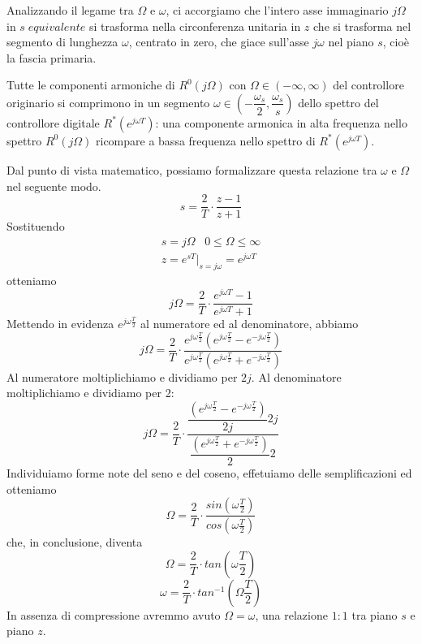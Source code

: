 \documentclass[a4paper]{report}
\begin{document}
Analizzando il legame tra $\Omega$ e $\omega$, ci accorgiamo che
l'intero asse immaginario $j \Omega$ in $s\; equivalente$ si trasforma
nella circonferenza unitaria in $z$ che si trasforma nel segmento di
lunghezza $\omega$, centrato in zero, che giace sull'asse $j \omega$
nel piano $s$, cio\`e la fascia primaria.

Tutte le componenti armoniche di $R^{0}(j \Omega)$ con $\Omega \in
(-\infty, \infty)$ del controllore originario si comprimono in un
segmento $\omega \in \left( -\dfrac{\omega_s}{2},
\dfrac{\omega_s}{s}\right)$ dello spettro del controllore digitale
$R^{*}(e^{j \omega T})$: una componente armonica in alta frequenza
nello spettro $R^{0}(j \Omega)$ ricompare a bassa frequenza nello
spettro di $R^{*}(e^{j \omega T})$.

Dal punto di vista matematico, possiamo formalizzare questa relazione
tra $\omega$ e $\Omega$ nel seguente modo.
\[
s = \dfrac{2}{T} \cdot \dfrac{z - 1}{z + 1}
\]
Sostituendo
\[
\begin{array}{l}
  s = j \Omega \;\;\;0 \leq \Omega \leq \infty\\
  z = e^{sT}|_{s = j \omega} = e^{j \omega T}
\end{array}
\]
otteniamo
\[
j \Omega = \dfrac{2}{T} \cdot \dfrac{e^{j \omega T} - 1}{e^{j \omega
    T} + 1}
\]
Mettendo in evidenza $e^{j \omega \frac{T}{2}}$ al numeratore ed al
denominatore, abbiamo
\[
j \Omega = \dfrac{2}{T} \cdot \dfrac{e^{j \omega \frac{T}{2}} \left(
  e^{j \omega \frac{T}{2}} - e^{-j \omega \frac{T}{2}}\right)}{e^{j
    \omega \frac{T}{2}} \left(e^{j \omega \frac{T}{2}} + e^{-j \omega
    \frac{T}{2}} \right)} 
\]
Al numeratore moltiplichiamo e dividiamo per $2j$. Al denominatore
moltiplichiamo e dividiamo per 2:
\[
j \Omega = \dfrac{2}{T} \cdot \dfrac{\dfrac{\left( e^{j \omega \frac{T}{2}} -
  e^{-j \omega \frac{T}{2}}\right)}{2j}2j}{\dfrac{\left(e^{j \omega \frac{T}{2}} +
  e^{-j \omega \frac{T}{2}} \right)}{2}2} 
\]
Individuiamo forme note del seno e del coseno, effetuiamo delle
semplificazioni ed otteniamo
\[
\Omega = \dfrac{2}{T} \cdot \dfrac{sin\left( \omega
  \frac{T}{2}\right)}{cos \left( \omega \frac{T}{2}\right)}
\]
che, in conclusione, diventa
\begin{equation}\label{eq:discretizzazioneTustin04}
  \Omega = \dfrac{2}{T} \cdot tan\left( \omega \dfrac{T}{2}\right)
\end{equation}
\[
\omega = \dfrac{2}{T} \cdot tan^{-1}\left( \Omega \dfrac{T}{2}\right)
\]
In assenza di compressione avremmo avuto $\Omega = \omega$, una
relazione $1:1$ tra piano $s$ e piano $z$.
\end{document}
